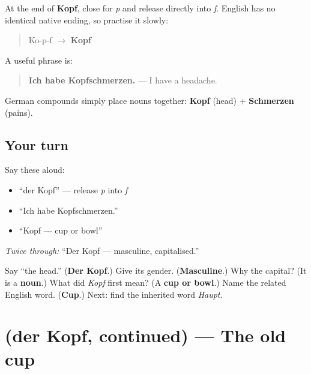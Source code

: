 \begin{sounds}
At the end of \textbf{Kopf}, close for \emph{p} and release directly into \emph{f}. English has no identical native ending, so practise it slowly:

\begin{quote}
Ko-p-f $\to$ \textbf{Kopf}
\end{quote}
\end{sounds}

\begin{grammarlens}[title={Grammar Lens: Kopf + Schmerzen}]
A useful phrase is:

\begin{quote}
\textbf{Ich habe Kopfschmerzen.} — I have a headache.
\end{quote}

German compounds simply place nouns together: \textbf{Kopf} (head) + \textbf{Schmerzen} (pains).
\end{grammarlens}

\subsection*{Your turn}
Say these aloud:

\begin{itemize}
\raggedright
  \item “der Kopf” — release \emph{p} into \emph{f}
  \item “Ich habe Kopfschmerzen.”
  \item “Kopf — cup or bowl”
\end{itemize}

\emph{Twice through:} “Der Kopf — masculine, capitalised.”

\begin{tcolorbox}[breakable,colback=teal!4,colframe=teal!35!black,title={Before you move on}]
Say “the head.” (\textbf{Der Kopf}.) Give its gender. (\textbf{Masculine}.) Why the capital? (It is a \textbf{noun}.) What did \emph{Kopf} first mean? (A \textbf{cup or bowl}.) Name the related English word. (\textbf{Cup}.) Next: find the inherited word \emph{Haupt}.
\end{tcolorbox}
\section[(der Kopf, continued)]{(der Kopf, continued) — The old cup}

\label{lesson:GE-C17-kopf-more}



